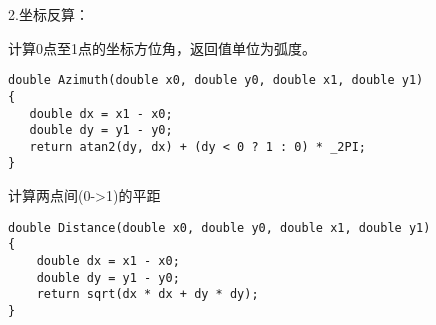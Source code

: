 2.坐标反算：

计算0点至1点的坐标方位角，返回值单位为弧度。
\begin{verbatim}
double Azimuth(double x0, double y0, double x1, double y1)
{
   double dx = x1 - x0;
   double dy = y1 - y0;
   return atan2(dy, dx) + (dy < 0 ? 1 : 0) * _2PI;
}
\end{verbatim}

计算两点间(0->1)的平距
\begin{verbatim}
double Distance(double x0, double y0, double x1, double y1)
{
    double dx = x1 - x0;
    double dy = y1 - y0;
    return sqrt(dx * dx + dy * dy);
}
\end{verbatim}
